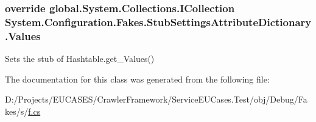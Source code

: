 \hypertarget{class_system_1_1_configuration_1_1_fakes_1_1_stub_settings_attribute_dictionary_af8e9bfbf2e5c1404442f1df4101c017e}{
\subsubsection[{Values}]{\setlength{\rightskip}{0pt plus 5cm}override global.\-System.\-Collections.\-I\-Collection System.\-Configuration.\-Fakes.\-Stub\-Settings\-Attribute\-Dictionary.\-Values\hspace{0.3cm}{\ttfamily [get]}}}\label{class_system_1_1_configuration_1_1_fakes_1_1_stub_settings_attribute_dictionary_af8e9bfbf2e5c1404442f1df4101c017e}


Sets the stub of Hashtable.\-get\-\_\-\-Values()



The documentation for this class was generated from the following file\-:\begin{DoxyCompactItemize}
\item 
D\-:/\-Projects/\-E\-U\-C\-A\-S\-E\-S/\-Crawler\-Framework/\-Service\-E\-U\-Cases.\-Test/obj/\-Debug/\-Fakes/s/\hyperlink{s_2f_8cs}{f.\-cs}\end{DoxyCompactItemize}
